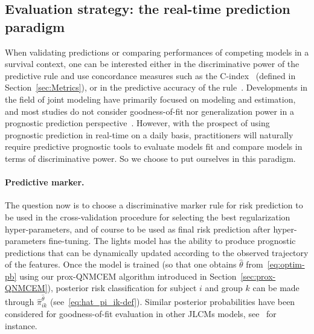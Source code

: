 \documentclass[11pt]{article}
\begin{document}
\subsection{Evaluation strategy: the real-time prediction paradigm}
\label{sec:evaluation strategy}

When validating predictions or comparing performances of competing models in a survival context, one can be interested either in the discriminative power of the predictive rule and use concordance measures such as the C-index~\citep{heagerty2005survival} (defined in Section~\ref{sec:Metrics}), or in the predictive accuracy of the rule~\citep{schemper2000predictive}.
Developments in the field of joint modeling have primarily focused on modeling and estimation, and most studies do not consider goodness-of-fit nor generalization power in a prognostic prediction perspective~\citep{hickey2016joint}. However, with the prospect of using prognostic prediction in real-time on a daily basis, practitioners will naturally require predictive prognostic tools to evaluate models fit and compare models in terms of discriminative power. So we choose to put ourselves in this paradigm.

\paragraph{Predictive marker.}

The question now is to choose a discriminative marker rule for risk prediction to be used in the cross-validation procedure for selecting the best regularization hyper-parameters, and of course to be used as final risk prediction after hyper-parameters fine-tuning.
The lights model has the ability to produce prognostic predictions that can be dynamically updated according to the observed trajectory of the features. 
Once the model is trained (so that one obtains $\hat\theta$ from~\eqref{eq:optim-pb} using our prox-QNMCEM algorithm introduced in Section~\ref{sec:prox-QNMCEM}), posterior risk classification for subject $i$ and group $k$ can be made through $\hat \pi_{ik}^{\hat\theta}$ (see~\eqref{eq:hat_pi_ik-def}). Similar posterior probabilities have been considered for goodness-of-fit evaluation in other JLCMs models, see~\citet{proust2014joint} for instance.
\end{document}
